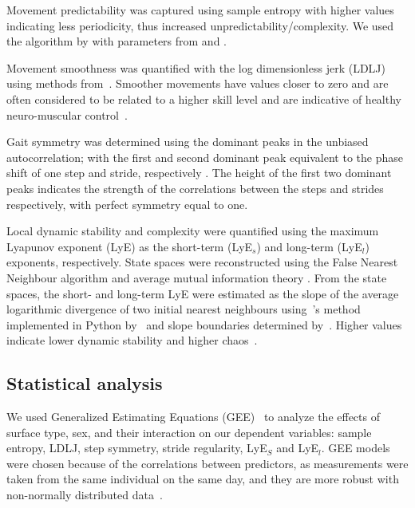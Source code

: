 \documentclass[authoryear,preprint,review,12pt]{elsarticle}
\begin{document}
Movement predictability was captured using sample entropy with higher values indicating less periodicity, thus increased unpredictability/complexity. We used the algorithm by \citet{richman_physiological_2000} with parameters from \citet{yentes2013appropriate} and \citet{govindan2007revisiting}.

Movement smoothness was quantified with the log dimensionless jerk (LDLJ) using methods from~\citet{melendez-calderon_estimating_2021}. Smoother movements have values closer to zero and are often considered to be related to a higher skill level and are indicative of healthy neuro-muscular control~\citep{balasubramanian_analysis_2015}. 

Gait symmetry was determined using the dominant peaks in the unbiased autocorrelation; with the first and second dominant peak equivalent to the phase shift of one step and stride, respectively \citep{moe2004estimation}. The height of the first two dominant peaks indicates the strength of the correlations between the steps and strides respectively, with perfect symmetry equal to one. 

Local dynamic stability and complexity were quantified using the maximum Lyapunov exponent (LyE) as the short-term (LyE$_{s}$) and long-term (LyE$_{l}$) exponents, respectively. 
State spaces were reconstructed using the False Nearest Neighbour algorithm and average mutual information theory \citep{stergiou_nonlinear_2016, sarwar_nonlinear_2023}. From the state spaces, the short- and long-term LyE were estimated as the slope of the average logarithmic divergence of two initial nearest neighbours using~\citet{rosenstein_practical_1993}'s method implemented in Python by~\citet{sarwar_nonlinear_2023} and slope boundaries determined by~\citet{bruijn2013assessing}. Higher values indicate lower dynamic stability and higher chaos~\citep{terrier2018maximum, bruijn2013assessing}. 

\subsection{Statistical analysis}
We used Generalized Estimating Equations (GEE)~\citep{ballinger2004using} to analyze the effects of surface type, sex, and their interaction on our dependent variables: sample entropy, LDLJ, step symmetry, stride regularity, LyE$_{S}$ and LyE$_{l}$. GEE models were chosen because of the correlations between predictors, as measurements were taken from the same individual on the same day, and they are more robust with non-normally distributed data~\citep{ballinger2004using}. 
\end{document}
